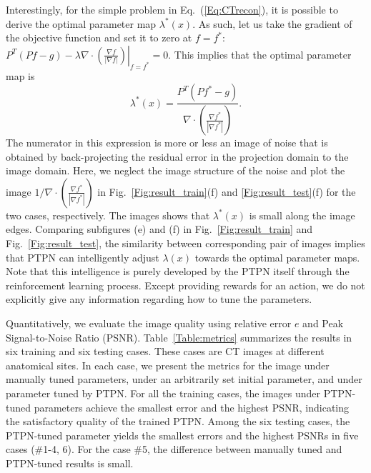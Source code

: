 \documentclass[journal]{IEEEtran}
\begin{document}
Interestingly, for the simple problem in Eq.~(\ref{Eq:CTrecon}), it is possible to derive the optimal parameter map $\lambda^*(x)$. As such, let us take the gradient of the objective function and set it to zero at $f=f^*$: $\left.P^T(Pf-g)-\lambda\nabla\cdot\left(\frac{\nabla f}{|\nabla f|}\right)\right|_{f=f^*}=0$.
This implies that the optimal parameter map is 
\begin{equation}
	\lambda^*(x)=\frac{P^T(Pf^*-g)}{\nabla\cdot\left(\frac{\nabla f^*}{|\nabla f^*|}\right)}.
\end{equation}  
The numerator in this expression is more or less an image of noise that is obtained by back-projecting the residual error in the projection domain to the image domain. Here, we neglect the image structure of the noise and plot the image $1/\nabla\cdot\left(\frac{\nabla f^*}{|\nabla f^*|}\right)$ in Fig.~\ref{Fig:result_train}(f) and \ref{Fig:result_test}(f) for the two cases, respectively. The images shows that $\lambda^*(x)$ is small along the image edges. Comparing subfigures (e) and (f) in Fig.~\ref{Fig:result_train} and Fig.~\ref{Fig:result_test}, the similarity between corresponding pair of images implies that PTPN can intelligently adjust $\lambda(x)$ towards the optimal parameter maps. Note that this intelligence is purely developed by the PTPN itself through the reinforcement learning process. Except providing rewards for an action, we do not explicitly give any information regarding how to tune the parameters. 

Quantitatively, we evaluate the image quality using relative error $e$ and Peak Signal-to-Noise Ratio (PSNR). Table~\ref{Table:metrics} summarizes the results in six training and six testing cases. These cases are CT images at different anatomical sites. In each case, we present the metrics for the image under manually tuned parameters, under an arbitrarily set initial parameter, and under parameter tuned by PTPN.  For all the training cases, the images under PTPN-tuned parameters achieve the smallest error and the highest PSNR, indicating the satisfactory quality of the trained PTPN. Among the six testing cases, the PTPN-tuned parameter yields the smallest errors and the highest PSNRs in five cases ($\#$1-4, 6). For the case $\#$5, the difference between manually tuned and PTPN-tuned results is small.
\end{document}
